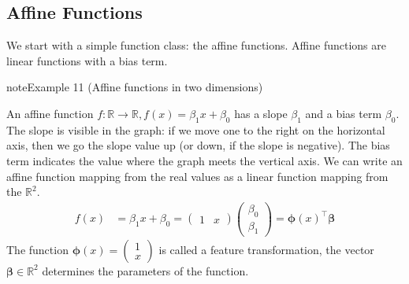 \documentclass[letterpaper,10pt,english]{jupyterBook}
\begin{document}
\subsection{Affine Functions}
\label{\detokenize{regression_functions:affine-functions}}
\sphinxAtStartPar
We start with a simple function class: the affine functions. Affine functions are linear functions with a bias term.
\label{regression_functions:example-0}
\begin{sphinxadmonition}{note}{Example 11 (Affine functions in two dimensions)}


\begin{center}\end{center}
\sphinxAtStartPar
An affine function \(f:\mathbb{R}\rightarrow\mathbb{R}, f(x)= \beta_1x+\beta_0\) has a slope \(\beta_1\) and a bias term \(\beta_0\). The slope is visible in the graph: if we move one to the right on the horizontal axis, then we go the slope value up (or down, if the slope is negative). The bias term indicates the value where the graph meets the vertical axis. We can write an affine function mapping from the real values as a linear function mapping from the \(\mathbb{R}^2\).
\begin{align*}
    f(x)&= \beta_1x+\beta_0 
    = \begin{pmatrix}1& x\end{pmatrix}
    \begin{pmatrix}\beta_0  \\ \beta_1
    \end{pmatrix}
    = \bm{\phi}(x)^\top\bm{\beta} 
\end{align*}
\sphinxAtStartPar
The function \(\bm{\phi}(x)=\begin{pmatrix}1\\x\end{pmatrix}\) is called a feature transformation, the vector \(\bm\beta\in\mathbb{R}^{2}\) determines the parameters of the function.
\end{sphinxadmonition}
\label{regression_functions:example-1}
\end{document}
